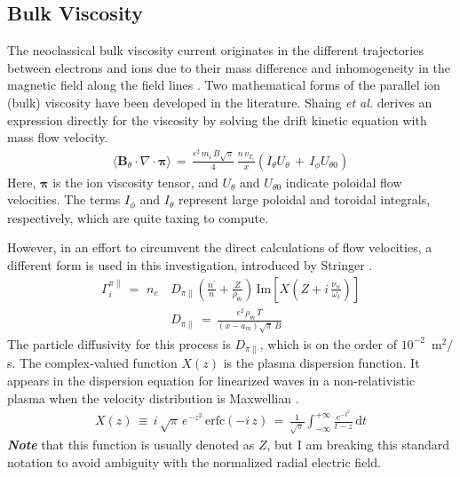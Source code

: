 \subsection{Bulk Viscosity}\label{ssec:bulk_viscosity}
The neoclassical bulk viscosity current originates in the different trajectories between electrons and ions due to their mass difference and inhomogeneity in the magnetic field along the field lines \cite{kobayashi_model_2017}.
Two mathematical forms of the parallel ion (bulk) viscosity have been developed in the literature.
Shaing \emph{et al.} \cite{shaing_bifurcation_1990} derives an expression directly for the viscosity by solving the drift kinetic equation with mass flow velocity.
\begin{align}%
	\langle \mathbf{B}_\theta \cdot \nabla \cdot \boldsymbol{\pi} \rangle \,=\,
		\frac{\epsilon^2 \, m_i \, B \sqrt{\pi}}{4} \, \frac{n\,v_{T_i}}{x}
		\left(I_\theta U_\theta \,+\, I_\phi U_{\theta 0}\right)
		\label{eq:shaing_bulk}
\end{align}
Here, $\boldsymbol{\pi}$ is the ion viscosity tensor, and $U_\theta$ and $U_{\theta 0}$ indicate poloidal flow velocities.
The terms $I_\phi$ and $I_\theta$ represent large poloidal and toroidal integrals, respectively, which are quite taxing to compute.

However, in an effort to circumvent the direct calculations of flow velocities, a different form is used in this investigation, introduced by Stringer \cite{stringer_explanation_1993}.
\begin{align} %
	\Gamma_i^{\pi\parallel} \,=\, \,n_e\,&D_{\pi\parallel}
		\left(\frac{n^\prime}{n} + \frac{Z}{\rho_{\theta i}}\right) \,
		\text{Im}\left[X\left(Z + i\,\frac{\nu_{ii}}{\omega_t}\right)\right]
		\label{eq:stringer_Gamma_bulk} \\
	&D_{\pi\parallel} \,=\, \frac{\epsilon^2\,\rho_{\theta i}\,T}
		{(x - a_m)\sqrt{\pi}\,B} \label{eq:stringer_D_bulk}
\end{align}
The particle diffusivity for this process is $D_{\pi\parallel}$, which is on the order of $10^{-2}$~m$^2 / $s.
The complex-valued function $X(z)$ is the plasma dispersion function.
It appears in the dispersion equation for linearized waves in a non-relativistic plasma when the velocity distribution is Maxwellian \cite{fried_plasma_2015}.
\begin{align} %
	X(z) \,\equiv\, i\,\sqrt{\pi} \, e^{-z^2} \, \text{erfc}(-i\,z) \,=\,
		\frac{1}{\sqrt{\pi}} \int_{-\infty}^{+\infty} \frac{e^{-t^2}}{t - z}
		\, \text{d}t \label{eq:plasma_disp}
\end{align}
\emph{\textbf{Note}} that this function is usually denoted as $Z$, but I am breaking this standard notation to avoid ambiguity with the normalized radial electric field.

